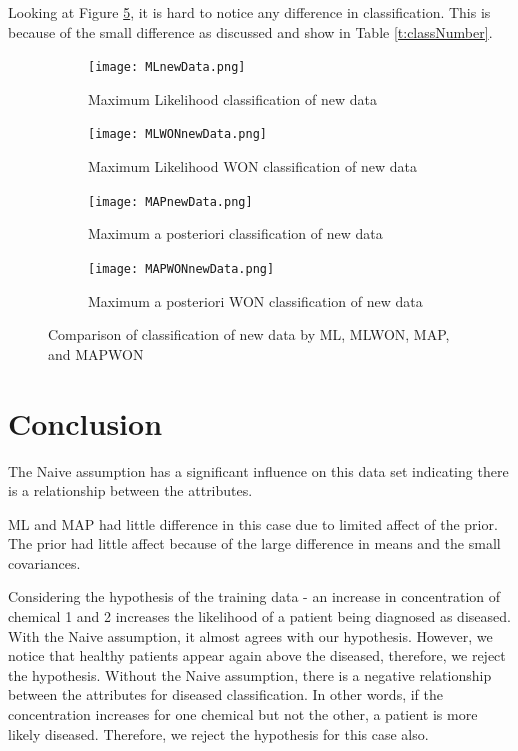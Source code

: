 {{Looking at Figure \ref{fig:overallC}, it is hard to notice any difference in classification. This is because of the small difference as discussed and show in Table \ref{t:classNumber}.

\begin{figure}[h!] 
	\centering
	\begin{subfigure}[b]{.49\textwidth}
		\texttt{[image: MLnewData.png]}
		\caption{Maximum Likelihood classification of new data}
		\label{fig:model0}
	\end{subfigure}
	\begin{subfigure}[b]{.49\textwidth}
		\texttt{[image: MLWONnewData.png]}
		\caption{Maximum Likelihood WON classification of new data}
		\label{fig:model1}
	\end{subfigure}
	\begin{subfigure}[b]{.49\textwidth}
		\texttt{[image: MAPnewData.png]}
		\caption{Maximum a posteriori classification of new data}
		\label{fig:model2}
	\end{subfigure}
	\begin{subfigure}[b]{.49\textwidth}
		\texttt{[image: MAPWONnewData.png]}
		\caption{Maximum a posteriori WON classification of new data}
		\label{fig:model3}
	\end{subfigure}
	\caption{Comparison of classification of new data by ML, MLWON, MAP, and MAPWON}
	\label{fig:overallC}
\end{figure}

\section{Conclusion}
The Naive assumption has a significant influence on this data set indicating there is a relationship between the attributes. 

ML and MAP had little difference in this case due to limited affect of the prior. The prior had little affect because of the large difference in means and the small covariances.

Considering the hypothesis of the training data - an increase in concentration of chemical 1 and 2 increases the likelihood of a patient being diagnosed as diseased. With the Naive assumption, it almost agrees with our hypothesis. However, we notice that healthy patients appear again above the diseased, therefore, we reject the hypothesis. Without the Naive assumption, there is a negative relationship between the attributes for diseased classification. In other words, if the concentration increases for one chemical but not the other, a patient is more likely diseased. Therefore, we reject the hypothesis for this case also.

}}
